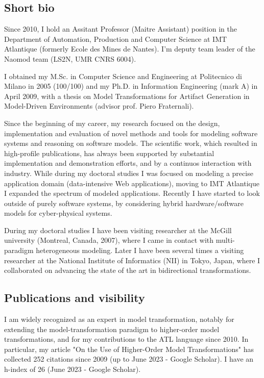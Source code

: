 
\subsection{Short bio}

Since 2010, I hold an Assitant Professor (Maitre Assistant) position in the Department of Automation, Production and Computer Science at IMT Atlantique (formerly Ecole des Mines de Nantes). I’m deputy team leader of the Naomod team (LS2N, UMR CNRS 6004).

I obtained my M.Sc. in Computer Science and Engineering at Politecnico di Milano in 2005 (100/100) and my Ph.D. in Information Engineering (mark A) in April 2009, with a thesis on Model Transformations for Artifact Generation in Model-Driven Environments (advisor prof. Piero Fraternali).

Since the beginning of my career, my research focused on the design, implementation and evaluation of novel methods and tools for modeling software systems and reasoning on software models. The scientific work, which resulted in high-profile publications, has always been supported by substantial implementation and demonstration efforts, and by a continuos interaction with industry. While during my doctoral studies I was focused on modeling a precise application domain (data-intensive Web applications), moving to IMT Atlantique I expanded the spectrum of modeled applications. Recently I have started to look outside of purely software systems, by considering hybrid hardware/software models for cyber-physical systems.

During my doctoral studies I have been visiting researcher at the McGill university (Montreal, Canada, 2007), where I came in contact with multi-paradigm heterogeneous modeling. Later I have been several times a visiting researcher at the National Institute of Informatics (NII) in Tokyo, Japan, where I collaborated on advancing the state of the art in bidirectional transformations.

\subsection{Publications and visibility}

I am widely recognized as an expert in model transformation, notably for extending the model-transformation paradigm to higher-order model transformations, and for my contributions to the ATL language since 2010. In particular, my article "On the Use of Higher-Order Model Transformations" has collected 252 citations since 2009 (up to June 2023 - Google Scholar). I have an h-index of 26 (June 2023 - Google Scholar).

